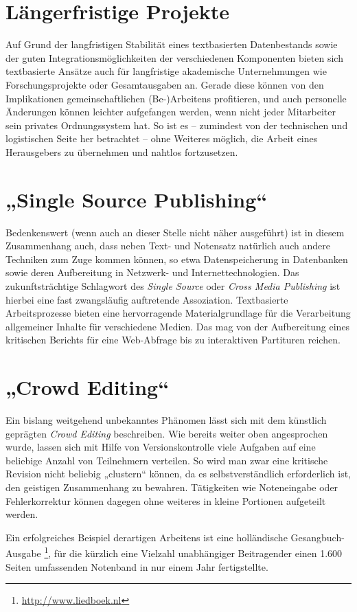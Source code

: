 \documentclass[DIV=12]{scrreprt}
\begin{document}
\section{Längerfristige Projekte}
\label{sec:pt_longrunning-projects}
Auf Grund der langfristigen Stabilität eines textbasierten Datenbestands sowie der guten Integrationsmöglichkeiten der verschiedenen Komponenten bieten sich textbasierte Ansätze auch für langfristige akademische Unternehmungen wie Forschungsprojekte oder Gesamtausgaben an.
Gerade diese können von den Implikationen gemeinschaftlichen (Be-)Arbeitens profitieren, und auch personelle Änderungen können leichter aufgefangen werden, wenn nicht jeder Mitarbeiter sein privates Ordnungssystem hat.
So ist es -- zumindest von der technischen und logistischen Seite her betrachtet -- ohne Weiteres möglich, die Arbeit eines Herausgebers zu übernehmen und nahtlos fortzusetzen.


\section{„Single Source Publishing“}
\label{sec:pt_single-source-publishing}
Bedenkenswert (wenn auch an dieser Stelle nicht näher ausgeführt) ist in diesem Zusammenhang auch, dass neben Text- und Notensatz natürlich auch andere Techniken zum Zuge kommen können, so etwa Datenspeicherung in Datenbanken sowie deren Aufbereitung in Netzwerk- und Internettechnologien.
Das zukunftsträchtige Schlagwort des \emph{Single Source} oder \emph{Cross Media Publishing} ist hierbei eine fast zwangsläufig auftretende Assoziation.
Textbasierte Arbeitsprozesse bieten eine hervorragende Materialgrundlage für die Verarbeitung allgemeiner Inhalte für verschiedene Medien.
Das mag von der Aufbereitung eines kritischen Berichts für eine Web-Abfrage bis zu interaktiven Partituren reichen.

\section{„Crowd Editing“}
\label{sec:pt_crowd-editing}
Ein bislang weitgehend unbekanntes Phänomen lässt sich mit dem künstlich geprägten \emph{Crowd Editing} beschreiben.
Wie bereits weiter oben angesprochen wurde, lassen sich mit Hilfe von Versionskontrolle viele Aufgaben auf eine beliebige Anzahl von Teilnehmern verteilen.
So wird man zwar eine kritische Revision nicht beliebig „clustern“ können, da es selbstverständlich erforderlich ist, den geistigen Zusammenhang zu bewahren.
Tätigkeiten wie Noteneingabe oder Fehlerkorrektur können dagegen ohne weiteres in kleine Portionen aufgeteilt werden.

Ein erfolgreiches Beispiel derartigen Arbeitens ist eine holländische Gesangbuch-Ausgabe%
\footnote{\url{http://www.liedboek.nl}},
für die kürzlich eine Vielzahl unabhängiger Beitragender einen 1.600 Seiten umfassenden Notenband in nur einem Jahr fertigstellte.
\end{document}
